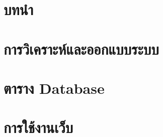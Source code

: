 \documentclass[10pt]{report}
\begin{document}
\chapter{บทนำ}

\newpage


\newpage


\newpage

\chapter{การวิเคราะห์และออกแบบระบบ}

\newpage


\newpage

\chapter{ตาราง Database}

\newpage

\chapter{การใช้งานเว็บ}

\newpage
\end{document}
